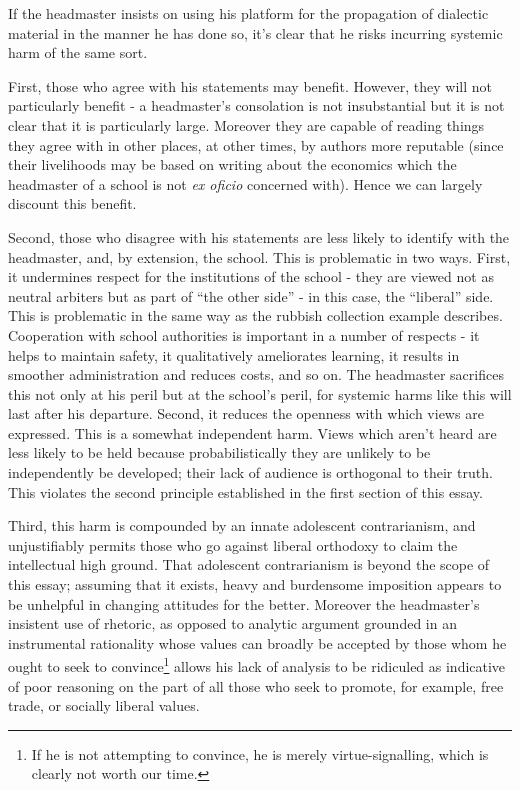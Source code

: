 \documentclass[12pt,a4paper]{report}
\newcounter{count}
\begin{document}
\begin{multicols}{2}
If the headmaster insists on using his platform for the propagation of
dialectic material in the manner he has done so, it's clear that he
risks incurring systemic harm of the same sort.

First, those who agree with his statements may benefit. However, they
will not particularly benefit - a headmaster's consolation is not
insubstantial but it is not clear that it is particularly large.
Moreover they are capable of reading things they agree with in other
places, at other times, by authors more reputable (since their
livelihoods may be based on writing about the economics which the
headmaster of a school is not \textit{ex oficio} concerned with). Hence we
can largely discount this benefit.

Second, those who disagree with his statements are less likely to
identify with the headmaster, and, by extension, the school. This is
problematic in two ways. First, it undermines respect for the
institutions of the school - they are viewed not as neutral arbiters but
as part of ``the other side'' - in this case, the ``liberal'' side. This
is problematic in the same way as the rubbish collection example
describes. Cooperation with school authorities is important in a number
of respects - it helps to maintain safety, it qualitatively ameliorates
learning, it results in smoother administration and reduces costs, and
so on. The headmaster sacrifices this not only at his peril but at the
school's peril, for systemic harms like this will last after his
departure. Second, it reduces the openness with which views are
expressed. This is a somewhat independent harm. Views which aren't heard
are less likely to be held because probabilistically they are unlikely
to be independently be developed; their lack of audience is orthogonal
to their truth. This violates the second principle established in the
first section of this essay.

Third, this harm is compounded by an innate adolescent contrarianism,
and unjustifiably permits those who go against liberal orthodoxy to
claim the intellectual high ground. That adolescent contrarianism is
beyond the scope of this essay; assuming that it exists, heavy and
burdensome imposition appears to be unhelpful in changing attitudes for
the better. Moreover the headmaster's insistent use of rhetoric, as
opposed to analytic argument grounded in an instrumental rationality
whose values can broadly be accepted by those whom he ought to seek to
convince\footnote{If he is not attempting to convince, he is merely
	virtue-signalling, which is clearly not worth our time.} allows his
lack of analysis to be ridiculed as indicative of poor reasoning on the
part of all those who seek to promote, for example, free trade, or
socially liberal values.


\end{multicols}
\end{document}
